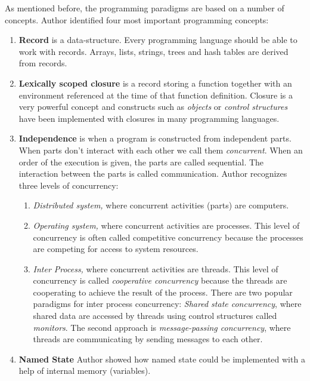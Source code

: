 \documentclass[12pt,twoside,a4paper]{report}
\begin{document}
As mentioned before, the programming paradigms are based on a number of concepts. Author identified four most important programming concepts:
\begin{enumerate}\itemsep1pt \parskip0pt 
\item \textbf{Record} is a data-structure. Every programming language should be able to work with records. Arrays, lists, strings, trees and hash tables are derived from records.
\item \textbf{Lexically scoped closure} is a record storing a function together with an environment referenced at the time of that function definition. Closure is a very powerful concept and constructs such as \textit{objects} or \textit{control structures} have been implemented with closures in many programming languages.
\item \textbf{Independence} is when a program is constructed from independent parts. When parts don’t interact with each other we call them \textit{concurrent}. When an order of the execution is given, the parts are called sequential. The interaction between the parts is called communication. Author recognizes three levels of concurrency:
    \begin{enumerate}\itemsep1pt \parskip0pt 
    \item \textit{Distributed system,} where concurrent activities (parts) are computers.
    \item \textit{Operating system,} where concurrent activities are processes. This level of concurrency is often called competitive concurrency because the processes are competing for access to system resources.
    \item \textit{Inter Process,} where concurrent activities are threads. This level of concurrency is called \textit{cooperative concurrency} because the threads are cooperating to achieve the result of the process. There are two popular paradigms for inter process concurrency: \textit{Shared state concurrency}, where shared data are accessed by threads using control structures called \textit{monitors}. The second approach is \textit{message-passing concurrency}, where threads are communicating by sending messages to each other.
    \end{enumerate}
\item \textbf{Named State} Author showed how named state could be implemented with a help of internal memory (variables).
\end{enumerate}

\end{document}
